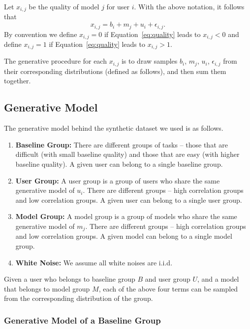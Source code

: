 \documentclass[letterpaper]{vldb}
\begin{document}
Let $x_{i,j}$ be the quality of model $j$ for user $i$. With the above notation, it follows that
\begin{equation}\label{eq:quality}
x_{i,j} = b_i + m_j + u_i + \epsilon_{i,j}.
\end{equation}
By convention we define $x_{i,j}=0$ if Equation~\ref{eq:quality} leads to $x_{i,j}<0$ and define $x_{i,j}=1$ if Equation~\ref{eq:quality} leads to $x_{i,j}>1$.

The generative procedure for each $x_{i,j}$ is to draw samples 
$b_i$, $m_j$, $u_i$, $\epsilon_{i,j}$ from their corresponding 
distributions (defined as follows), and then sum them together.

\subsection{Generative Model}

The generative model behind the synthetic dataset we used is as follows.

\begin{enumerate}
\item {\bf Baseline Group:} There are different groups of tasks -- those that are difficult (with small
baseline quality) and those that are easy (with higher baseline quality). A given user can belong
to a single baseline group.
\item {\bf User Group:} A user group is a group of users who share the
same generative model of $u_i$. There are different groups -- high correlation groups
and low correlation groups. A given user can belong to a single user group.
\item {\bf Model Group:} A model group is a group of models who share
the same generative model of $m_j$. There are different groups -- high correlation groups
and low correlation groups. A given model can belong to a single model group.
\item {\bf White Noise:} We assume all white noises are i.i.d.
\end{enumerate}

Given a user who belongs to baseline group $B$ and user group $U$,
and a model that belongs to model group $M$, each of the above four terms
can be sampled from the corresponding distribution of the group.

\subsubsection{Generative Model of a Baseline Group}
\end{document}
